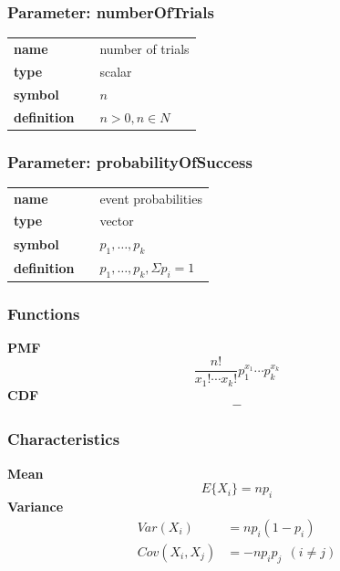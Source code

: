 
\subsubsection*{Parameter: numberOfTrials}

\noindent\begin{tabular}{p{2cm}cl}
\textbf{name} & & number of trials \\
\textbf{type} & & scalar \\
\textbf{symbol} & & $n$  \\
\textbf{definition} & & $n > 0, n \in N$
\end{tabular}
\subsubsection*{Parameter: probabilityOfSuccess}

\noindent\begin{tabular}{p{2cm}cl}
\textbf{name} & & event probabilities \\
\textbf{type} & & vector \\
\textbf{symbol} & & $p_1, \ldots, p_k$  \\
\textbf{definition} & & $p_1, \ldots, p_k, \Sigma p_i = 1$
\end{tabular}
\subsubsection*{Functions}

\smallskip \noindent \hspace{.2cm} \textbf{PMF} 
\begin{equation*}\frac{n!}{x_1!\cdots x_k!} p_1^{x_1} \cdots p_k^{x_k}\end{equation*}
\smallskip \noindent \hspace{.2cm} \textbf{CDF} 
\begin{equation*}-\end{equation*}
\smallskip
\subsubsection*{Characteristics}
\smallskip \noindent \hspace{.2cm} \textbf{Mean} 
\begin{equation*}E\{X_i\} = np_i\end{equation*}
\smallskip \noindent \hspace{.2cm} \textbf{Variance} 
\begin{align*}Var(X_i) &= n p_i (1-p_i) \\
Cov(X_i,X_j) &= - n p_i p_j~~(i\neq j)\end{align*}
\smallskip
